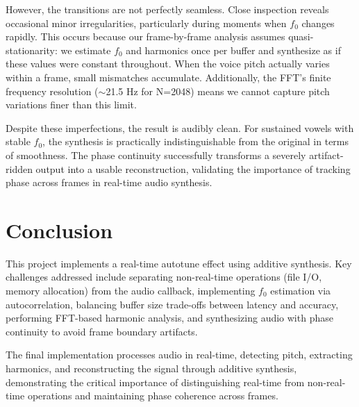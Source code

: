 \documentclass[11pt,a4paper]{article}
\begin{document}
However, the transitions are not perfectly seamless. Close inspection reveals occasional minor irregularities, particularly during moments when $f_0$ changes rapidly. This occurs because our frame-by-frame analysis assumes quasi-stationarity: we estimate $f_0$ and harmonics once per buffer and synthesize as if these values were constant throughout. When the voice pitch actually varies within a frame, small mismatches accumulate. Additionally, the FFT's finite frequency resolution ($\sim$21.5 Hz for N=2048) means we cannot capture pitch variations finer than this limit.

Despite these imperfections, the result is audibly clean. For sustained vowels with stable $f_0$, the synthesis is practically indistinguishable from the original in terms of smoothness. The phase continuity successfully transforms a severely artifact-ridden output into a usable reconstruction, validating the importance of tracking phase across frames in real-time audio synthesis.

\section{Conclusion}

This project implements a real-time autotune effect using additive synthesis. Key challenges addressed include separating non-real-time operations (file I/O, memory allocation) from the audio callback, implementing $f_0$ estimation via autocorrelation, balancing buffer size trade-offs between latency and accuracy, performing FFT-based harmonic analysis, and synthesizing audio with phase continuity to avoid frame boundary artifacts.

The final implementation processes audio in real-time, detecting pitch, extracting harmonics, and reconstructing the signal through additive synthesis, demonstrating the critical importance of distinguishing real-time from non-real-time operations and maintaining phase coherence across frames.
\end{document}
